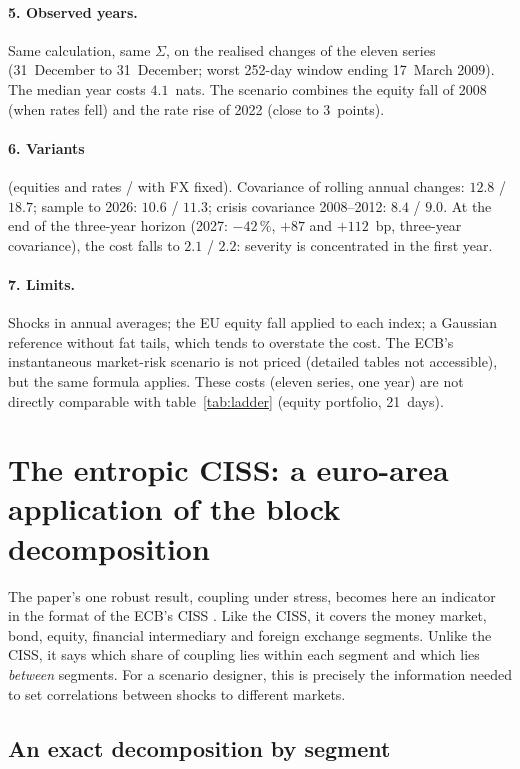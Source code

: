 \documentclass[11pt]{article}
\theoremstyle{definition}
\begin{document}
\paragraph{5. Observed years.} Same calculation, same $\Sigma$, on the
realised changes of the eleven series (31~December to 31~December; worst
252-day window ending 17~March 2009). The median year costs $4.1$~nats. The
scenario combines the equity fall of 2008 (when rates fell) and the rate rise
of 2022 (close to $3$~points).

\paragraph{6. Variants} (equities and rates / with FX fixed). Covariance of
rolling annual changes: $12.8$ / $18.7$; sample to 2026: $10.6$ / $11.3$;
crisis covariance 2008--2012: $8.4$ / $9.0$. At the end of the three-year
horizon (2027: $-42\,\%$, $+87$ and $+112$~bp, three-year covariance), the cost
falls to $2.1$ / $2.2$: severity is concentrated in the first year.

\paragraph{7. Limits.} Shocks in annual averages; the EU equity fall applied
to each index; a Gaussian reference without fat tails, which tends to
overstate the cost. The ECB's instantaneous market-risk scenario is not priced
(detailed tables not accessible), but the same formula applies. These costs
(eleven series, one year) are not directly comparable with
table~\ref{tab:ladder} (equity portfolio, 21~days).


\section{The entropic CISS: a euro-area application of the block decomposition}
\label{oa:ciss}

The paper's one robust result, coupling under stress, becomes here an
indicator in the format of the ECB's CISS \citep{hollo2012}. Like the CISS, it
covers the money market, bond, equity, financial intermediary and foreign
exchange segments. Unlike the CISS, it says which share of coupling lies
within each segment and which lies \emph{between} segments. For a scenario
designer, this is precisely the information needed to set correlations
between shocks to different markets.

\subsection{An exact decomposition by segment}
\end{document}
